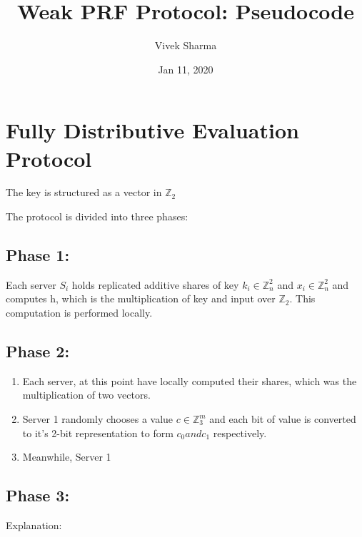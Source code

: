 \documentclass[11pt]{article}
\title{Weak PRF Protocol: Pseudocode}
\author{Vivek Sharma}
\date{Jan 11, 2020}
\begin{document}
\maketitle


\section{Fully Distributive Evaluation Protocol}
The key is structured as a vector in $\mathbb{Z}_2$


The protocol is divided into three phases:

\subsection{Phase 1:} 
Each server $S_{i}$ holds replicated additive shares of key $k_{i} \in \mathbb{Z}_{n}^{2}$ and $x_{i} \in \mathbb{Z}_{n}^{2}$ and computes h, which is the multiplication of key and input over $\mathbb{Z}_2$. This computation is performed locally. 
\subsection{Phase 2:}

\begin{enumerate}
	\item Each server, at this point have locally computed their shares, which was the multiplication of two vectors.
	\item Server 1 randomly chooses a value $c \in \mathbb{Z}_{3}^{m}$ and each bit of value is converted to it's 2-bit representation to form $c_{0} and c_{1}$ respectively. 
	\item Meanwhile, Server 1 
\end{enumerate}

\subsection{Phase 3:}


 
Explanation:
\end{document}
